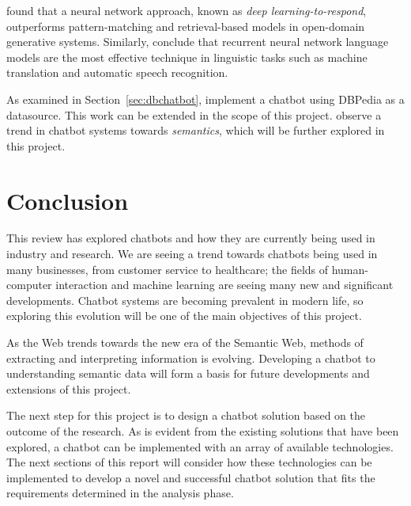 \citet{yan2016learning} found that a neural network approach, known as {\it deep learning-to-respond}, outperforms pattern-matching and retrieval-based models in open-domain generative systems. Similarly, \citet{mikolov2011extensions} conclude that recurrent neural network language models are the most effective technique in linguistic tasks such as machine translation and automatic speech recognition.

As examined in Section~\ref{sec:dbchatbot}, \citet{ramngongausbeck2018} implement a chatbot using DBPedia as a datasource. This work can be extended in the scope of this project. \citet{bradevsko2012survey} observe a trend in chatbot systems towards {\it semantics}, which will be further explored in this project.

\section{Conclusion}
This review has explored chatbots and how they are currently being used in industry and research. We are seeing a trend towards chatbots being used in many businesses, from customer service to healthcare; the fields of human-computer interaction and machine learning are seeing many new and significant developments. Chatbot systems are becoming prevalent in modern life, so exploring this evolution will be one of the main objectives of this project.

As the Web trends towards the new era of the Semantic Web, methods of extracting and interpreting information is evolving. Developing a chatbot to understanding semantic data will form a basis for future developments and extensions of this project.

The next step for this project is to design a chatbot solution based on the outcome of the research. As is evident from the existing solutions that have been explored, a chatbot can be implemented with an array of available technologies. The next sections of this report will consider how these technologies can be implemented to develop a novel and successful chatbot solution that fits the requirements determined in the analysis phase.





